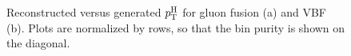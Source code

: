 \begin{figure}[b]
\centering
{}
\caption{Reconstructed versus generated $p_\mathrm{T}^\mathrm{H}$ for gluon fusion (a) and VBF (b). Plots are normalized by rows, so that the bin purity is shown on the diagonal.\label{fig:response_by_row}}
\end{figure}
